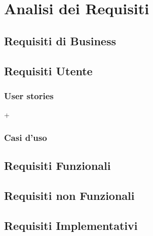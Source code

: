 
\chapter{Analisi dei Requisiti}
	\section{Requisiti di Business}
	
	\section{Requisiti Utente}
        \subsection{User stories}
+	    \subsection{Casi d'uso}
	\section{Requisiti Funzionali}
	\section{Requisiti non Funzionali}
	\section{Requisiti Implementativi}
